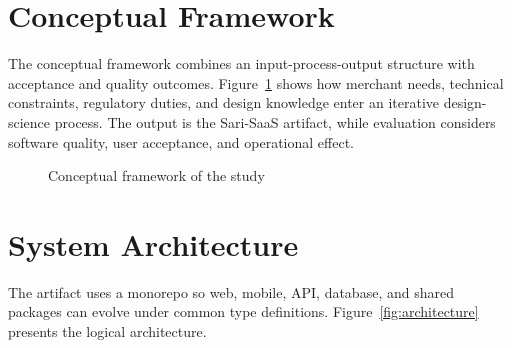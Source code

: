 \documentclass[12pt,oneside]{report}
\begin{document}
\section{Conceptual Framework}
The conceptual framework combines an input-process-output structure with
acceptance and quality outcomes. Figure~\ref{fig:conceptual} shows how merchant
needs, technical constraints, regulatory duties, and design knowledge enter an
iterative design-science process. The output is the Sari-SaaS artifact, while
evaluation considers software quality, user acceptance, and operational effect.

\begin{figure}[H]
\centering
{}
\caption{Conceptual framework of the study}
\label{fig:conceptual}
\end{figure}

\section{System Architecture}
The artifact uses a monorepo so web, mobile, API, database, and shared packages
can evolve under common type definitions. Figure~\ref{fig:architecture} presents
the logical architecture.
\end{document}
